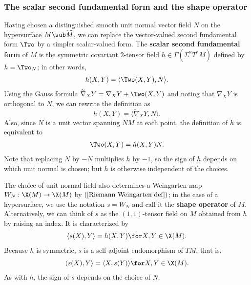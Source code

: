 \subsubsection{The scalar second fundamental form and the shape operator}
Having chosen a distinguished smooth unit normal vector field $N$ on the hypersurface $M\sub\widetilde{M}$, we can replace the vector-valued second fundamental form 
$\Two$ by a simpler scalar-valued form. The \textbf{scalar second fundamental form} of $M$ is the symmetric covariant $2$-tensor field $h\in\Gamma(\Sigma^2T^*M)$ defined 
by $h=\Two_N$; in other words,
\[h(X,Y)=\langle\Two(X,Y),N\rangle.\]
Using the Gauss formula $\widetilde{\nabla}_XY=\nabla_XY+\Two(X,Y)$ and noting that $\nabla_XY$ is orthogonal to $N$, we can rewrite the definition as
\[h(X,Y)=\langle\widetilde{\nabla}_XY,N\rangle.\]
Also, since $N$ is a unit vector spanning $NM$ at each point, the definition of $h$ is equivalent to
\begin{align}\label{Riemann shapre operator hypersurface}
\Two(X,Y)=h(X,Y)N.
\end{align}
Note that replacing $N$ by $-N$ multiplies $h$ by $-1$, so the sign of $h$ depends on which unit normal is chosen; but $h$ is otherwise independent of the choices.\par
The choice of unit normal field also determines a Weingarten map $W_N:\X(M)\to\X(M)$ by $(\ref{Riemann Weingarten def})$; in the case of a hypersurface, we use the notation $s=W_N$ and call it the \textbf{shape operator} of $M$. Alternatively, we can think of $s$ as the $(1,1)$-tensor field on $M$ obtained from $h$ by raising an index. It is characterized by
\[\langle s(X),Y\rangle=h(X,Y)\for X,Y\in\X(M).\]
Because $h$ is symmetric, $s$ is a self-adjoint endomorphism of $TM$, that is,
\[\langle s(X),Y\rangle=\langle X,s(Y)\rangle\for X,Y\in\X(M).\]
As with $h$, the sign of $s$ depends on the choice of $N$.\par
